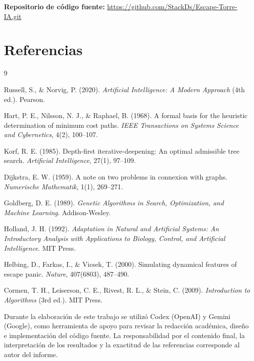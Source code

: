 \documentclass[11pt,letterpaper]{article}
\begin{document}
\par\vspace{0.4cm}
\noindent\textbf{Repositorio de código fuente:} \url{https://github.com/StackDs/Escape-Torre-IA.git}

\newpage

\section{Referencias}

\begingroup
\renewcommand{\section}[2]{}%
\begin{thebibliography}{9}
\setlength{\itemsep}{2pt}
\setlength{\parskip}{0pt}

Russell, S., \& Norvig, P. (2020).
\textit{Artificial Intelligence: A Modern Approach} (4th ed.).
Pearson.

Hart, P. E., Nilsson, N. J., \& Raphael, B. (1968).
A formal basis for the heuristic determination of minimum cost paths.
\textit{IEEE Transactions on Systems Science and Cybernetics}, 4(2), 100--107.

Korf, R. E. (1985).
Depth-first iterative-deepening: An optimal admissible tree search.
\textit{Artificial Intelligence}, 27(1), 97--109.

Dijkstra, E. W. (1959).
A note on two problems in connexion with graphs.
\textit{Numerische Mathematik}, 1(1), 269--271.

Goldberg, D. E. (1989).
\textit{Genetic Algorithms in Search, Optimization, and Machine Learning}.
Addison-Wesley.

Holland, J. H. (1992).
\textit{Adaptation in Natural and Artificial Systems: An Introductory Analysis with Applications to Biology, Control, and Artificial Intelligence}.
MIT Press.

Helbing, D., Farkas, I., \& Vicsek, T. (2000).
Simulating dynamical features of escape panic.
\textit{Nature}, 407(6803), 487--490.

Cormen, T. H., Leiserson, C. E., Rivest, R. L., \& Stein, C. (2009).
\textit{Introduction to Algorithms} (3rd ed.).
MIT Press.

\end{thebibliography}
\endgroup

\section*{Declaración de Uso de IA Generativa}
Durante la elaboración de este trabajo se utilizó Codex (OpenAI) y Gemini (Google), como herramienta de apoyo para revisar la redacción académica, diseño e implementación del código fuente. La responsabilidad por el contenido final, la interpretación de los resultados y la exactitud de las referencias corresponde al autor del informe.
\end{document}
